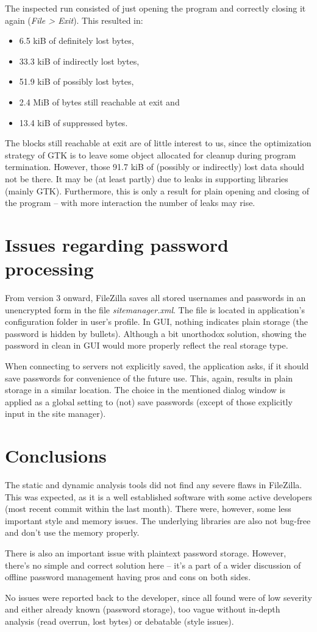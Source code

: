 \documentclass[11pt]{article}
\begin{document}
The inspected run consisted of just opening the program and correctly closing it again (\textit{File > Exit}). This resulted in:
\begin{itemize}[topsep=0pt, itemsep=0pt]
\item 6.5 kiB of definitely lost bytes,
\item 33.3 kiB of indirectly lost bytes,
\item 51.9 kiB of possibly lost bytes,
\item 2.4 MiB of bytes still reachable at exit and
\item 13.4 kiB of suppressed bytes.
\end{itemize}
\noindent
The blocks still reachable at exit are of little interest to us, since the optimization strategy of GTK is to leave some object allocated for cleanup during program termination. However, those 91.7 kiB of (possibly or indirectly) lost data should not be there. It may be (at least partly) due to leaks in supporting libraries (mainly GTK). Furthermore, this is only a result for plain opening and closing of the program -- with more interaction the number of leaks may rise.

\section{Issues regarding password processing}

From version 3 onward, FileZilla saves all stored usernames and passwords in an unencrypted form in the file \textit{sitemanager.xml}. The file is located in application's configuration folder in user's profile. In GUI, nothing indicates plain storage (the password is hidden by bullets). Although a bit unorthodox solution, showing the password in clean in GUI would more properly reflect the real storage type.

When connecting to servers not explicitly saved, the application asks, if it should save passwords for convenience of the future use. This, again, results in plain storage in a similar location. The choice in the mentioned dialog window is applied as a global setting to (not) save passwords (except of those explicitly input in the site manager).

\section{Conclusions}

The static and dynamic analysis tools did not find any severe flaws in FileZilla. This was expected, as it is a well established software with some active developers (most recent commit within the last month). There were, however, some less important style and memory issues. The underlying libraries are also not bug-free and don't use the memory properly.

There is also an important issue with plaintext password storage. However, there's no simple and correct solution here -- it's a part of a wider discussion of offline password management having pros and cons on both sides.

No issues were reported back to the developer, since all found were of low severity and either already known (password storage), too vague without in-depth analysis (read overrun, lost bytes) or debatable (style issues).
\end{document}

